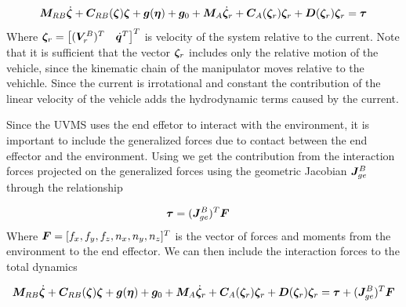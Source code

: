 \begin{align}
  \boldsymbol M_{RB}\dot{\boldsymbol \zeta}+ \boldsymbol C_{RB}(\boldsymbol \zeta)\boldsymbol \zeta + \boldsymbol g(\boldsymbol \eta) + \boldsymbol g_0 + \boldsymbol M_A \dot{\boldsymbol \zeta}_r  + \boldsymbol C_A(\boldsymbol \zeta_r) \boldsymbol \zeta_r + \boldsymbol D(\boldsymbol \zeta_r) \boldsymbol \zeta_r = \boldsymbol \tau 
  \label{eq:withinteraction}
\end{align}
Where $\boldsymbol \zeta_r = \begin{bmatrix} (\boldsymbol V_r^B)^T & \dot{\boldsymbol q}^T  \end{bmatrix}^T$ is velocity of the system relative to the current. Note that it is sufficient that the vector $\boldsymbol \zeta_r$ includes only the relative motion of the vehicle, since the kinematic chain of the manipulator moves relative to the vehichle. Since the current is irrotational and constant the contribution of the linear velocity of the vehicle adds the hydrodynamic terms caused by the current. 

Since the UVMS uses the end effetor to interact with the environment, it is important to include the generalized forces due to contact between the end effector and the environment. Using \cite{spong2005robot} we get the contribution from the interaction forces projected on the generalized forces using the geometric Jacobian $\boldsymbol J_{ge}^B$ through the relationship

\begin{align}
  \boldsymbol \tau&= (\boldsymbol J_{ge}^B)^T \boldsymbol F 
  \label{eq:jacobian_force}
\end{align}
Where $\boldsymbol F= [f_x, f_y, f_z, n_x, n_y,n_z]^T  $ is the vector of forces and moments from the environment to the end effector. We can then include the interaction forces to the total dynamics

\begin{mdframed}[style=graybox]
\begin{align}
  \boldsymbol M_{RB}\dot{\boldsymbol \zeta}+ \boldsymbol C_{RB}(\boldsymbol \zeta)\boldsymbol \zeta + \boldsymbol g(\boldsymbol \eta) + \boldsymbol g_0 + \boldsymbol M_A \dot{\boldsymbol \zeta}_r  + \boldsymbol C_A(\boldsymbol \zeta_r) \boldsymbol \zeta_r + \boldsymbol D(\boldsymbol \zeta_r) \boldsymbol \zeta_r =\boldsymbol \tau+ (\boldsymbol J_{ge}^B)^T \boldsymbol F 
\label{eq:dyn_with_current}
\end{align}
\end{mdframed}



























